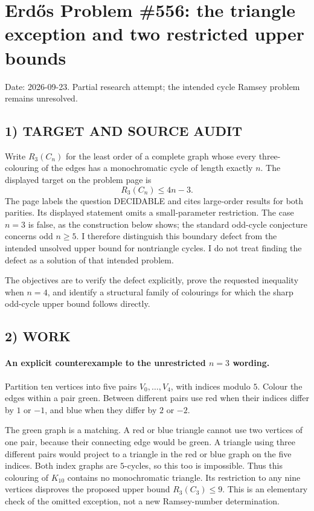 \section{Erd\H{o}s Problem \#556: the triangle exception and two restricted upper bounds}
\noindent Date: 2026-09-23. Partial research attempt; the intended cycle Ramsey problem remains unresolved.

\subsection{1) TARGET AND SOURCE AUDIT}
Write $R_3(C_n)$ for the least order of a complete graph whose every three-colouring of the edges has a monochromatic cycle of length exactly $n$. The displayed target on the problem page is
\[
R_3(C_n)\le4n-3.
\]
The page labels the question DECIDABLE and cites large-order results for both parities. Its displayed statement omits a small-parameter restriction. The case $n=3$ is false, as the construction below shows; the standard odd-cycle conjecture concerns odd $n\ge5$. I therefore distinguish this boundary defect from the intended unsolved upper bound for nontriangle cycles. I do not treat finding the defect as a solution of that intended problem.

The objectives are to verify the defect explicitly, prove the requested inequality when $n=4$, and identify a structural family of colourings for which the sharp odd-cycle upper bound follows directly.

\subsection{2) WORK}
\paragraph{An explicit counterexample to the unrestricted $n=3$ wording.}
Partition ten vertices into five pairs $V_0,\ldots,V_4$, with indices modulo $5$. Colour the edges within a pair green. Between different pairs use red when their indices differ by $1$ or $-1$, and blue when they differ by $2$ or $-2$.

The green graph is a matching. A red or blue triangle cannot use two vertices of one pair, because their connecting edge would be green. A triangle using three different pairs would project to a triangle in the red or blue graph on the five indices. Both index graphs are $5$-cycles, so this too is impossible. Thus this colouring of $K_{10}$ contains no monochromatic triangle. Its restriction to any nine vertices disproves the proposed upper bound $R_3(C_3)\le9$. This is an elementary check of the omitted exception, not a new Ramsey-number determination.

